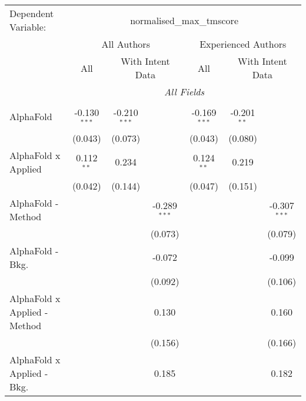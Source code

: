 \begingroup
\centering
\begin{tabular}{lcccccc}
   \tabularnewline \midrule \midrule
   Dependent Variable: & \multicolumn{6}{c}{normalised\_max\_tmscore}\\
 & \multicolumn{3}{c}{All Authors} & \multicolumn{3}{c}{Experienced Authors} \\
\cmidrule(lr){2-4} \cmidrule(lr){5-7}
 & \multicolumn{1}{c}{All} & \multicolumn{2}{c}{With Intent Data} & \multicolumn{1}{c}{All} & \multicolumn{2}{c}{With Intent Data} \\
\cmidrule(lr){2-2} \cmidrule(lr){3-4} \cmidrule(lr){5-5} \cmidrule(lr){6-7}
 & \multicolumn{6}{c}{\textit{All Fields}} \\ \\
   AlphaFold                      & -0.130$^{***}$ & -0.210$^{***}$ &                & -0.169$^{***}$ & -0.201$^{**}$ &   \\   
                                  & (0.043)        & (0.073)        &                & (0.043)        & (0.080)       &   \\   
   AlphaFold x Applied            & 0.112$^{**}$   & 0.234          &                & 0.124$^{**}$   & 0.219         &   \\   
                                  & (0.042)        & (0.144)        &                & (0.047)        & (0.151)       &   \\   
   AlphaFold - Method             &                &                & -0.289$^{***}$ &                &               & -0.307$^{***}$\\   
                                  &                &                & (0.073)        &                &               & (0.079)\\   
   AlphaFold - Bkg.               &                &                & -0.072         &                &               & -0.099\\   
                                  &                &                & (0.092)        &                &               & (0.106)\\   
   AlphaFold x Applied - Method   &                &                & 0.130          &                &               & 0.160\\   
                                  &                &                & (0.156)        &                &               & (0.166)\\   
   AlphaFold x Applied - Bkg.     &                &                & 0.185          &                &               & 0.182\\   

\end{tabular}
